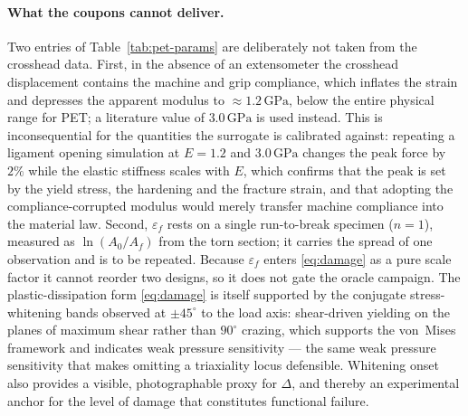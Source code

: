 \documentclass[pdflatex,sn-mathphys-num]{sn-jnl}%
\theoremstyle{thmstyleone}%
\theoremstyle{thmstyletwo}%
\theoremstyle{thmstylethree}%
\begin{document}
\paragraph{What the coupons cannot deliver.}
Two entries of Table~\ref{tab:pet-params} are deliberately not taken from the
crosshead data. First, in the absence of an extensometer the crosshead
displacement contains the machine and grip compliance, which inflates the strain
and depresses the apparent modulus to $\approx1.2\,\mathrm{GPa}$, below the entire
physical range for PET; a literature value of $3.0\,\mathrm{GPa}$ is used instead.
This is inconsequential for the quantities the surrogate is calibrated against:
repeating a ligament opening simulation at $E=1.2$ and $3.0\,\mathrm{GPa}$ changes
the peak force by $2\%$ while the elastic stiffness scales with $E$, which
confirms that the peak is set by the yield stress, the hardening and the fracture
strain, and that adopting the compliance-corrupted modulus would merely transfer
machine compliance into the material law. Second, $\varepsilon_f$ rests on a single
run-to-break specimen ($n=1$), measured as $\ln(A_0/A_f)$ from the torn section; it
carries the spread of one observation and is to be repeated. Because
$\varepsilon_f$ enters \eqref{eq:damage} as a pure scale factor it cannot reorder two
designs, so it does not gate the oracle campaign. The plastic-dissipation form
\eqref{eq:damage} is itself supported by the conjugate
stress-whitening bands observed at $\pm45^\circ$ to the load axis: shear-driven
yielding on the planes of maximum shear rather than $90^\circ$ crazing, which
supports the von~Mises framework and indicates weak pressure sensitivity --- the
same weak pressure sensitivity that makes omitting a triaxiality locus defensible.
Whitening onset also provides a visible, photographable proxy for $\Delta$, and thereby
an experimental anchor for the level of damage that constitutes functional failure.
\end{document}
